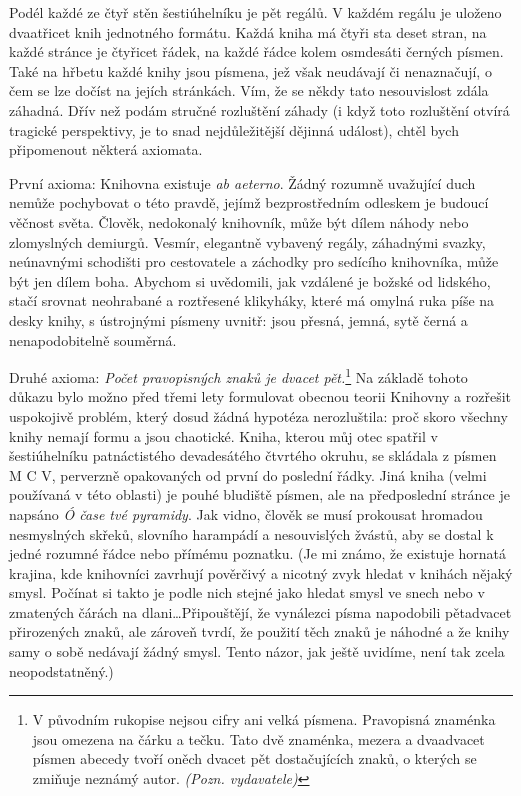 \documentclass[11pt]{article}
\begin{document}
Podél každé ze čtyř stěn šestiúhelníku je pět regálů. V každém regálu je uloženo dvaatřicet knih jednotného formátu. Každá kniha má čtyři sta deset stran, na každé stránce je čtyřicet řádek, na každé řádce kolem osmdesáti černých písmen. Také na hřbetu každé knihy jsou písmena, jež však neudávají či nenaznačují, o čem se lze dočíst na jejích stránkách. Vím, že se někdy tato nesouvislost zdála záhadná. Dřív než podám stručné rozluštění záhady (i když toto rozluštění otvírá tragické perspektivy, je to snad nejdůležitější dějinná událost), chtěl bych připomenout některá axiomata.

První axioma: Knihovna existuje \textit{ab aeterno}. Žádný rozumně uvažující duch nemůže pochybovat o této pravdě, jejímž bezprostředním odleskem je budoucí věčnost světa. Člověk, nedokonalý knihovník, může být dílem náhody nebo zlomyslných demiurgů. Vesmír, elegantně vybavený regály, záhadnými svazky, neúnavnými schodišti pro cestovatele a záchodky pro sedícího knihovníka, může být jen dílem boha. Abychom si uvědomili, jak vzdálené je božské od lidského, stačí srovnat neohrabané a roztřesené klikyháky, které má omylná ruka píše na desky knihy, s ústrojnými písmeny uvnitř: jsou přesná, jemná, sytě černá a nenapodobitelně souměrná.

Druhé axioma: \textit{Počet pravopisných znaků je dvacet pět.}\footnote{V původním rukopise nejsou cifry ani velká písmena. Pravopisná znaménka jsou omezena na čárku a tečku. Tato dvě znaménka, mezera a dvaadvacet písmen abecedy tvoří oněch dvacet pět dostačujících znaků, o kterých se zmiňuje neznámý autor. \textit{(Pozn. vydavatele)}} Na základě tohoto důkazu bylo možno před třemi lety formulovat obecnou teorii Knihovny a rozřešit uspokojivě problém, který dosud žádná hypotéza nerozluštila: proč skoro všechny knihy nemají formu a jsou chaotické. Kniha, kterou můj otec spatřil v šestiúhelníku patnáctistého devadesátého čtvrtého okruhu, se skládala z písmen M C V, perverzně opakovaných od první do poslední řádky. Jiná kniha (velmi používaná v této oblasti) je pouhé bludiště písmen, ale na předposlední stránce je napsáno \textit{Ó čase tvé pyramidy}. Jak vidno, člověk se musí prokousat hromadou nesmyslných skřeků, slovního harampádí a nesouvislých žvástů, aby se dostal k jedné rozumné řádce nebo přímému poznatku. (Je mi známo, že existuje hornatá krajina, kde knihovníci zavrhují pověrčivý a nicotný zvyk hledat v knihách nějaký smysl. Počínat si takto je podle nich stejné jako hledat smysl ve snech nebo v zmatených čárách na dlani\dots Připouštějí, že vynálezci písma napodobili pětadvacet přirozených znaků, ale zároveň tvrdí, že použití těch znaků je náhodné a že knihy samy o sobě nedávají žádný smysl. Tento názor, jak ještě uvidíme, není tak zcela neopodstatněný.)
\end{document}
